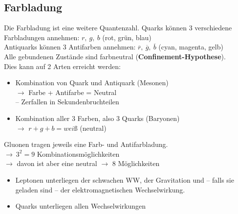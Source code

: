 \documentclass[Ex4_Zusammenfassung.tex]{subfiles}
\begin{document}
\subsection{Farbladung}
Die Farbladung ist eine weitere Quantenzahl. 
Quarks können 3 verschiedene Farbladungen annehmen: $r,\ g,\ b$ (rot, grün, blau)\\
Antiquarks können 3 Antifarben annehmen: $\overline{r},\ \overline{g},\ \overline{b}$ (cyan, magenta, gelb)\\

Alle gebundenen Zustände sind farbneutral (\textbf{Confinement-Hypothese}).\\
Dies kann auf 2 Arten erreicht werden:
\begin{itemize}
	\item Kombination von Quark und Antiquark (Mesonen)\\
	$\rightarrow$ Farbe + Antifarbe = Neutral\\
	\quad -- Zerfallen in Sekundenbruchteilen
	\item Kombination aller 3 Farben, also 3 Quarks (Baryonen)\\
	$\rightarrow$ $r+g+b=weiß$ (neutral)
\end{itemize}

Gluonen tragen jeweils eine Farb- und Antifarbladung.\\
$\rightarrow\ 3^2 = 9$ Kombinationsmöglichkeiten\\
$\rightarrow$ davon ist aber eine neutral $\rightarrow$ 8 Möglichkeiten

\begin{itemize}
	\item Leptonen unterliegen der schwachen WW, der Gravitation und -- falls sie geladen sind -- der elektromagnetischen Wechselwirkung.
	\item Quarks unterliegen allen Wechselwirkungen
\end{itemize}
\end{document}
